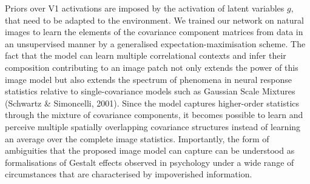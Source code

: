 \documentclass[12pt,a4paper]{article}
\begin{document}
%
Priors over V1 activations are imposed by the activation of latent variables $g$, that need to be adapted to the environment. We trained our network on natural images to learn the elements of the covariance component matrices from data in an unsupervised manner by  a generalised expectation-maximisation scheme. 
The fact that the model can learn multiple correlational contexts and infer their composition contributing to an image patch not only extends the power of this image model but also extends the spectrum of phenomena in neural response statistics relative to single-covariance models such as Gaussian Scale Mixtures (Schwartz \& Simoncelli, 2001).  Since the model captures higher-order statistics  through the mixture of covariance components, it becomes possible to learn and perceive multiple spatially overlapping covariance structures instead of learning an average over the complete image statistics. Importantly, the form of ambiguities that the proposed image model can capture can be  understood as formalisations of Gestalt effects observed in psychology under a wide range of circumstances that are characterised by impoverished information. 
\end{document}
